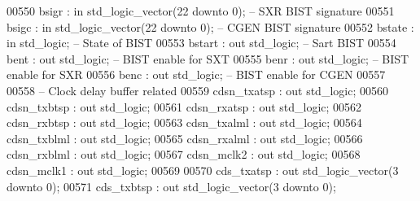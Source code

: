 \begin{DoxyCode}
00550         bsigr       : \textcolor{keywordflow}{in} \textcolor{comment}{std\_logic\_vector}(\textcolor{vhdllogic}{}\textcolor{vhdllogic}{22} \textcolor{keywordflow}{downto} \textcolor{vhdllogic}{}\textcolor{vhdllogic}{0}); \textcolor{keyword}{-- SXR BIST signature}
00551         bsigc       : \textcolor{keywordflow}{in} \textcolor{comment}{std\_logic\_vector}(\textcolor{vhdllogic}{}\textcolor{vhdllogic}{22} \textcolor{keywordflow}{downto} \textcolor{vhdllogic}{}\textcolor{vhdllogic}{0}); \textcolor{keyword}{-- CGEN BIST signature}
00552         bstate  : \textcolor{keywordflow}{in} \textcolor{comment}{std\_logic};                                         \textcolor{keyword}{-- State of BIST}
00553         bstart  : \textcolor{keywordflow}{out} \textcolor{comment}{std\_logic};                                        \textcolor{keyword}{-- Sart BIST}
00554         bent        : \textcolor{keywordflow}{out} \textcolor{comment}{std\_logic};                                        \textcolor{keyword}{-- BIST enable for SXT}
00555         benr        : \textcolor{keywordflow}{out} \textcolor{comment}{std\_logic};                                        \textcolor{keyword}{-- BIST enable for SXR}
00556         benc        : \textcolor{keywordflow}{out} \textcolor{comment}{std\_logic};                                        \textcolor{keyword}{-- BIST enable for CGEN}
00557 
00558 \textcolor{keyword}{    -- Clock delay buffer related}
00559     cdsn\_txatsp   : \textcolor{keywordflow}{out} \textcolor{comment}{std\_logic};
00560     cdsn\_txbtsp   : \textcolor{keywordflow}{out} \textcolor{comment}{std\_logic};
00561     cdsn\_rxatsp   : \textcolor{keywordflow}{out} \textcolor{comment}{std\_logic};
00562     cdsn\_rxbtsp   : \textcolor{keywordflow}{out} \textcolor{comment}{std\_logic};
00563     cdsn\_txalml   : \textcolor{keywordflow}{out} \textcolor{comment}{std\_logic};
00564     cdsn\_txblml   : \textcolor{keywordflow}{out} \textcolor{comment}{std\_logic};
00565     cdsn\_rxalml   : \textcolor{keywordflow}{out} \textcolor{comment}{std\_logic};
00566     cdsn\_rxblml   : \textcolor{keywordflow}{out} \textcolor{comment}{std\_logic};
00567     cdsn\_mclk2    : \textcolor{keywordflow}{out} \textcolor{comment}{std\_logic};
00568     cdsn\_mclk1    : \textcolor{keywordflow}{out} \textcolor{comment}{std\_logic};
00569      
00570     cds\_txatsp    : \textcolor{keywordflow}{out} \textcolor{comment}{std\_logic\_vector}(\textcolor{vhdllogic}{}\textcolor{vhdllogic}{3} \textcolor{keywordflow}{downto} \textcolor{vhdllogic}{}\textcolor{vhdllogic}{0});
00571     cds\_txbtsp    : \textcolor{keywordflow}{out} \textcolor{comment}{std\_logic\_vector}(\textcolor{vhdllogic}{}\textcolor{vhdllogic}{3} \textcolor{keywordflow}{downto} \textcolor{vhdllogic}{}\textcolor{vhdllogic}{0});

\end{DoxyCode}
